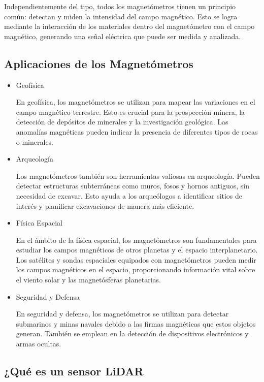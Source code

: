 Independientemente del tipo, todos los magnetómetros tienen un principio común: detectan y miden la intensidad del campo magnético. Esto se logra mediante la interacción de los materiales dentro del magnetómetro con el campo magnético, generando una señal eléctrica que puede ser medida y analizada.

\subsection{Aplicaciones de los Magnetómetros}

\begin{itemize}
    \item Geofísica
    
    En geofísica, los magnetómetros se utilizan para mapear las variaciones en el campo magnético terrestre. Esto es crucial para la prospección minera, la detección de depósitos de minerales y la investigación geológica. Las anomalías magnéticas pueden indicar la presencia de diferentes tipos de rocas o minerales.
    
    \item Arqueología
    
    Los magnetómetros también son herramientas valiosas en arqueología. Pueden detectar estructuras subterráneas como muros, fosos y hornos antiguos, sin necesidad de excavar. Esto ayuda a los arqueólogos a identificar sitios de interés y planificar excavaciones de manera más eficiente.
    
    \item Física Espacial
     
    En el ámbito de la física espacial, los magnetómetros son fundamentales para estudiar los campos magnéticos de otros planetas y el espacio interplanetario. Los satélites y sondas espaciales equipados con magnetómetros pueden medir los campos magnéticos en el espacio, proporcionando información vital sobre el viento solar y las magnetósferas planetarias.
    
    \item Seguridad y Defensa

     En seguridad y defensa, los magnetómetros se utilizan para detectar submarinos y minas navales debido a las firmas magnéticas que estos objetos generan. También se emplean en la detección de dispositivos electrónicos y armas ocultas.
    
    
\end{itemize}

\subsection{¿Qué es un sensor LiDAR}

